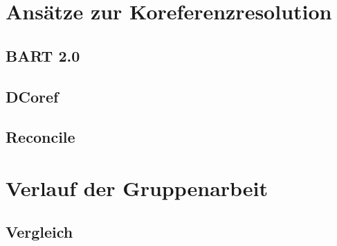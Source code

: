 \documentclass[a4paper,12pt,titlepage=true, ngerman]{scrartcl}
\begin{document}

\newpage

\section{Ansätze zur Koreferenzresolution}\label{Ansätze zur Koreferenzresolution} %



\subsection{BART 2.0}





\subsection{DCoref}





\subsection{Reconcile}




\newpage

\section{Verlauf der Gruppenarbeit}\label{Verlauf der Gruppenarbeit} %



\subsection{Vergleich}%
\end{document}
